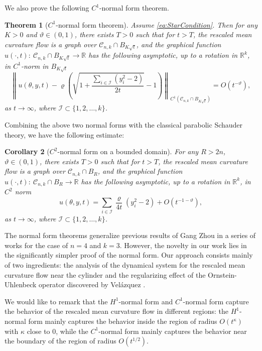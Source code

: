 \documentclass[11pt]{amsart}
\numberwithin{equation}{section}
\newtheorem{theorem}{Theorem}[section]
\newtheorem{corollary}[theorem]{Corollary}
\numberwithin{equation}{section}
\newcommand{\cC}{\mathcal{C}}
\newcommand{\R}{\mathbb{R}}
\begin{document}
	We also prove the following $C^1$-normal form theorem.
	
	\begin{theorem}[$C^1$-normal form theorem]\label{ThmNF-sqrtt-C1}
		Assume \eqref{eq:StarCondition}. Then for any $K>0$ and $\vartheta\in(0,1)$, there exists $T>0$ such that for $t>T$, the rescaled mean curvature flow is a graph over $\cC_{n,k}\cap B_{K\sqrt{t}}$, and the graphical function $u(\cdot,t):\ \cC_{n,k}\cap B_{K\sqrt{t}}\to \R$
		has the following asymptotic, up to a rotation in $\R^k$, in $C^1$-norm in $B_{K\sqrt{t}}$
		\begin{equation}
			\left\|u(\theta,y,t)-\varrho\left(\sqrt{1+\frac{ \sum_{i\in \mathcal I}(y_i^2-2)}{2t}}-1\right)\right\|_{C^1(\cC_{n,k}\cap B_{K\sqrt{t}})}=O(t^{-\vartheta}),
		\end{equation}
		as $t\to\infty$, where $\mathcal I\subset \{1,2,\ldots,k\}$. 
	\end{theorem}
	Combining the above two normal forms with the classical parabolic Schauder theory, we have the following estimate: 
	
	\begin{corollary}[$C^2$-normal form on a bounded domain]\label{ThmNF-sqrtt-C1bdd}
		For any $R>2n$, $\vartheta\in(0,1)$, there exists $T>0$ such that for $t>T$, the rescaled mean curvature flow is a graph over $\cC_{n,k}\cap B_{R}$, and the graphical function $u(\cdot,t):\ \cC_{n,k}\cap B_{R}\to \R$
		has the following asymptotic, up to a rotation in $\R^k$, in $C^2$ norm
		\begin{equation}
			u(\theta,y,t)=\sum_{i\in \mathcal I}\frac{\varrho }{4t}(y_i^2-2)+O(t^{-1-\vartheta}),
		\end{equation}
		as $t\to\infty$, where $\mathcal I\subset \{1,2,\ldots,k\}$. 
	\end{corollary}
	
	The normal form theorems generalize previous results of Gang Zhou in a series of works \cite{G1, G2} for the case of $n=4$ and $k=3$. However, the novelty in our work lies in the significantly simpler proof of the normal form. Our approach consists mainly of two ingredients: the analysis of the dynamical system for the rescaled mean curvature flow near the cylinder and the regularizing effect of the Ornstein-Uhlenbeck operator discovered by Vel\'azquez \cite{V1, V2}.
	
	
	We would like to remark that the $H^1$-normal form and $C^1$-normal form capture the behavior of the rescaled mean curvature flow in different regions: the $H^1$-normal form mainly captures the behavior inside the region of radius $O(t^{\kappa})$ with $\kappa$ close to $0$, while the $C^1$-normal form mainly captures the behavior near the boundary of the region of radius $O(t^{1/2})$.
	
\end{document}
